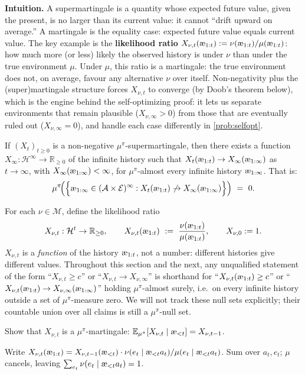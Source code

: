 \documentclass[fontsize=11pt, parskip=half]{scrartcl}
\newcommand{\cA}{\mathcal{A}}
\newcommand{\cE}{\mathcal{E}}
\newcommand{\cH}{\mathcal{H}}
\newcommand{\cM}{\mathcal{M}}
\newcommand{\Ex}{\mathbb{E}}
\newcommand{\aes}{\textnormal{\ae}}
\begin{document}
\textbf{Intuition.}
A supermartingale is a quantity whose expected future value, given the present, is no larger than its current value: it cannot ``drift upward on average.'' A martingale is the equality case: expected future value equals current value.
The key example is the \textbf{likelihood ratio} $X_{\nu,t}(\aes_{1:t}) := \nu(\aes_{1:t})/\mu(\aes_{1:t})$: how much more (or less) likely the observed history is under $\nu$ than under the true environment $\mu$.
Under $\mu$, this ratio is a martingale: the true environment does not, on average, favour any alternative $\nu$ over itself.
Non-negativity plus the (super)martingale structure forces $X_{\nu,t}$ to converge (by Doob's theorem below), which is the engine behind the self-optimizing proof: it lets us separate environments that remain plausible ($X_{\nu,\infty} > 0$) from those that are eventually ruled out ($X_{\nu,\infty} = 0$), and handle each case differently in \cref{prob:selfopt}.

\begin{fact}\label{fact:doob}
If $(X_t)_{t \geq 0}$ is a non-negative $\mu^\pi$-supermartingale, then there exists a function $X_\infty : \cH^\infty \to \mathbb{R}_{\geq 0}$ of the infinite history such that $X_t(\aes_{1:t}) \to X_\infty(\aes_{1:\infty})$ as $t \to \infty$, with $X_\infty(\aes_{1:\infty}) < \infty$, for $\mu^\pi$-almost every infinite history $\aes_{1:\infty}$.
That is:
\[
    \mu^\pi\!\Big(\Big\{\aes_{1:\infty} \in (\cA \times \cE)^\infty : X_t(\aes_{1:t}) \not\to X_\infty(\aes_{1:\infty})\Big\}\Big) ~=~ 0.
\]
\end{fact}

For each $\nu \in \cM$, define the likelihood ratio
\[
    X_{\nu,t} : \cH^t \to \mathbb{R}_{\geq 0}, \qquad X_{\nu,t}(\aes_{1:t}) ~:=~ \frac{\nu(\aes_{1:t})}{\mu(\aes_{1:t})}, \qquad X_{\nu,0} := 1.
\]
$X_{\nu,t}$ is a \emph{function} of the history $\aes_{1:t}$, not a number: different histories give different values. Throughout this section and the next, any unqualified statement of the form ``$X_{\nu,t} \geq c$'' or ``$X_{\nu,t} \to X_{\nu,\infty}$'' is shorthand for ``$X_{\nu,t}(\aes_{1:t}) \geq c$'' or ``$X_{\nu,t}(\aes_{1:t}) \to X_{\nu,\infty}(\aes_{1:\infty})$'' holding $\mu^\pi$-almost surely, i.e.\ on every infinite history outside a set of $\mu^\pi$-measure zero. We will not track these null sets explicitly; their countable union over all claims is still a $\mu^\pi$-null set.

\begin{exercise}
\label{prob:martingale}
Show that $X_{\nu,t}$ is a $\mu^\pi$-martingale: $\Ex_{\mu^\pi}[X_{\nu,t} \mid \aes_{<t}] = X_{\nu,t-1}$.


\begin{hint}
Write $X_{\nu,t}(\aes_{1:t}) = X_{\nu,t-1}(\aes_{<t}) \cdot \nu(e_t \mid \aes_{<t} a_t)/\mu(e_t \mid \aes_{<t} a_t)$. Sum over $a_t, e_t$; $\mu$ cancels, leaving $\sum_{e_t} \nu(e_t \mid \aes_{<t} a_t) = 1$.
\end{hint}
\end{exercise}
\end{document}
